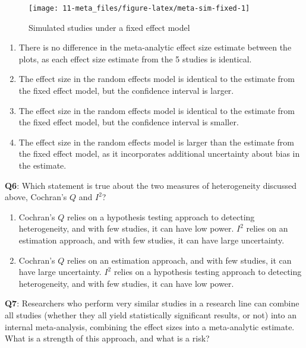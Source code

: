 \documentclass[
  oneside]{book}
\providecommand{\tightlist}{%
  \setlength{\itemsep}{0pt}\setlength{\parskip}{0pt}}
\begin{document}
\begin{figure}

{\centering \texttt{[image: 11-meta\_files/figure-latex/meta-sim-fixed-1]} 

}

\caption{Simulated studies under a fixed effect model}\label{fig:meta-sim-fixed}
\end{figure}

\begin{enumerate}
\def\labelenumi{\Alph{enumi})}
\tightlist
\item
  There is no difference in the meta-analytic effect size estimate between the plots, as each effect size estimate from the 5 studies is identical.
\item
  The effect size in the random effects model is identical to the estimate from the fixed effect model, but the confidence interval is larger.
\item
  The effect size in the random effects model is identical to the estimate from the fixed effect model, but the confidence interval is smaller.
\item
  The effect size in the random effects model is larger than the estimate from the fixed effect model, as it incorporates additional uncertainty about bias in the estimate.
\end{enumerate}

\textbf{Q6}: Which statement is true about the two measures of heterogeneity discussed above, Cochran's \(Q\) and \(I^2\)?

\begin{enumerate}
\def\labelenumi{\Alph{enumi})}
\tightlist
\item
  Cochran's \(Q\) relies on a hypothesis testing approach to detecting heterogeneity, and with few studies, it can have low power. \(I^2\) relies on an estimation approach, and with few studies, it can have large uncertainty.
\item
  Cochran's \(Q\) relies on an estimation approach, and with few studies, it can have large uncertainty. \(I^2\) relies on a hypothesis testing approach to detecting heterogeneity, and with few studies, it can have low power.
\end{enumerate}

\textbf{Q7}: Researchers who perform very similar studies in a research line can combine all studies (whether they all yield statistically significant results, or not) into an internal meta-analysis, combining the effect sizes into a meta-analytic estimate. What is a strength of this approach, and what is a risk?
\end{document}

